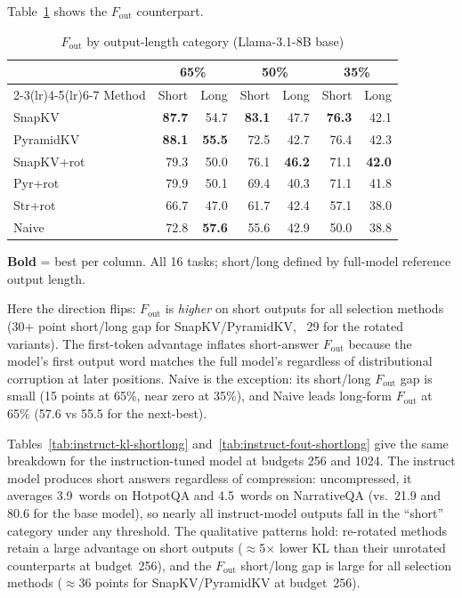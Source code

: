 \documentclass[10pt,letterpaper]{article}
\begin{document}
Table~\ref{tab:base-fout-shortlong} shows the \(F_{\text{out}}\) counterpart.

\begin{table}[H]
\centering
\small
\captionsetup{justification=centering}
\caption{\(F_{\text{out}}\) by output-length category (Llama-3.1-8B base)}
\label{tab:base-fout-shortlong}
\begin{tabular}{@{}lrrrrrr@{}}
\toprule
& \multicolumn{2}{c}{65\%} & \multicolumn{2}{c}{50\%} & \multicolumn{2}{c}{35\%}\\
\cmidrule(lr){2-3}\cmidrule(lr){4-5}\cmidrule(lr){6-7}
Method & Short & Long & Short & Long & Short & Long\\
\midrule
SnapKV     & \textbf{87.7} & 54.7 & \textbf{83.1} & 47.7 & \textbf{76.3} & 42.1\\
PyramidKV  & \textbf{88.1} & \textbf{55.5} & 72.5 & 42.7 & 76.4 & 42.3\\
SnapKV+rot & 79.3 & 50.0 & 76.1 & \textbf{46.2} & 71.1 & \textbf{42.0}\\
Pyr+rot    & 79.9 & 50.1 & 69.4 & 40.3 & 71.1 & 41.8\\
Str+rot    & 66.7 & 47.0 & 61.7 & 42.4 & 57.1 & 38.0\\
Naive      & 72.8 & \textbf{57.6} & 55.6 & 42.9 & 50.0 & 38.8\\
\bottomrule
\end{tabular}
\center\smallskip
\textbf{Bold} = best per column.
All 16 tasks; short/long defined by full-model reference output length.
\end{table}

Here the direction flips: \(F_{\text{out}}\) is \emph{higher} on short outputs for
all selection methods (30+ point short/long gap for SnapKV/PyramidKV, ~29 for
the rotated variants). The first-token advantage inflates short-answer
\(F_{\text{out}}\) because the model's first output word matches the full
model's regardless of distributional corruption at later positions.
Naive is the exception: its short/long \(F_{\text{out}}\) gap is small
(15 points at 65\%, near zero at 35\%), and Naive leads long-form
\(F_{\text{out}}\) at 65\% (57.6 vs 55.5 for the next-best).

Tables~\ref{tab:instruct-kl-shortlong} and~\ref{tab:instruct-fout-shortlong}
give the same breakdown for the instruction-tuned model at budgets 256 and 1024.
The instruct model produces short answers regardless of compression: uncompressed,
it averages 3.9~words on HotpotQA and 4.5~words on NarrativeQA (vs.\ 21.9
and 80.6 for the base model), so nearly all instruct-model outputs fall in
the ``short'' category under any threshold. The qualitative patterns hold:
re-rotated methods retain a large advantage on short outputs ($\approx$5$\times$
lower KL than their unrotated counterparts at budget~256), and the
\(F_{\text{out}}\) short/long gap is large for all selection methods ($\approx$36
points for SnapKV/PyramidKV at budget~256).
\end{document}
